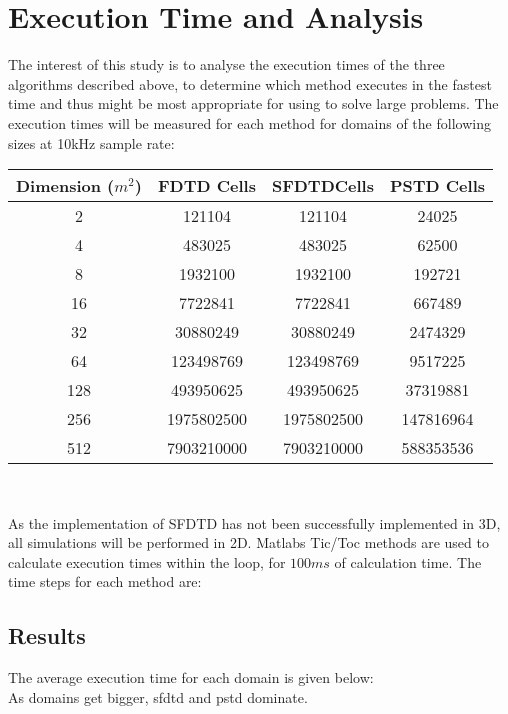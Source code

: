 %
%
%
\chapter{Execution Time and Analysis}
\label{Introduction}
The interest of this study is to analyse the execution times of the three algorithms described above, to determine which method executes in the fastest time and thus might be most appropriate for using to solve large problems. The execution times will be measured for each method for domains of the following sizes at 10kHz sample rate:\\
\begin{center}
\begin{tabular}{|c|c|c|c|} 
  \hline
 Dimension ($m^2$) & FDTD Cells & SFDTDCells & PSTD Cells \\
 \hline
 2 & 121104	& 121104 & 24025\\ 
 4 & 483025 & 483025 & 62500\\  
 8 & 1932100 & 1932100 & 192721\\ 
 16 & 7722841 & 7722841 & 667489\\ 
 32 & 30880249 & 30880249 & 2474329\\ 
 64 & 123498769 & 123498769 & 9517225\\ 
 128 & 493950625 & 493950625 & 37319881\\ 
 256 & 1975802500 & 1975802500 & 147816964\\
 512 & 7903210000 & 7903210000 & 588353536\\
 \hline
\end{tabular}\\
\end{center}
As the implementation of SFDTD has not been successfully implemented  in 3D, all simulations will be performed in 2D. Matlabs Tic/Toc methods are used to calculate execution times within the loop, for $100ms$ of calculation time. The time steps for each method are:\\


\section{Results}
The average execution time for each domain is given below: \\

As domains get bigger, sfdtd and pstd dominate.


